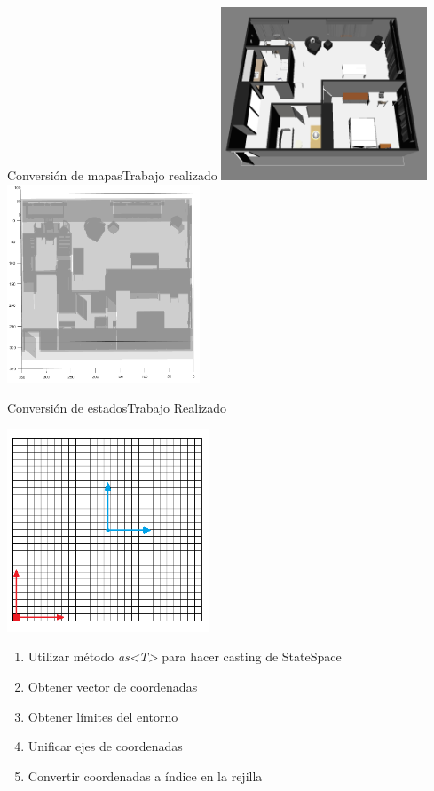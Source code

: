\documentclass[10pt]{beamer}
\begin{document}
\begin{frame}{Conversión de mapas}{Trabajo realizado}
\includegraphics[width=0.46\textwidth,keepaspectratio]{ApartOMPL}	\hspace{0.5cm}
\includegraphics[width=0.43\textwidth,keepaspectratio]{ApartSEC}	
\end{frame}


\begin{frame}{Conversión de estados}{Trabajo Realizado}
	\begin{multicols}{2}
		\includegraphics[width=0.45\textwidth,keepaspectratio]{ejes}	
		\begin{enumerate}
			\item Utilizar método \textit{as<T>} para hacer casting de StateSpace
			\item Obtener vector de coordenadas
			\item Obtener límites del entorno
			\item Unificar ejes de coordenadas
			\item Convertir coordenadas a índice en la rejilla
		\end{enumerate}
	\end{multicols}
\end{frame}
\end{document}
